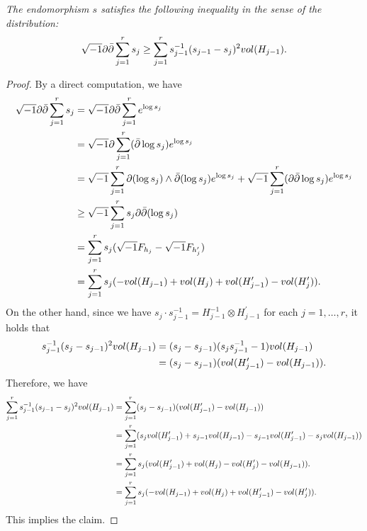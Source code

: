 \documentclass[10pt,a4paper]{amsart}
\def\inum{{\sqrt{-1}}}
\def\vol{{\rm vol}}
\begin{document}
\begin{lemm}\label{ddbars}{\it The endomorphism $s$ satisfies the following inequality in the sense of the distribution:
\begin{align}
\inum\partial\bar{\partial} \sum_{j=1}^rs_j\geq \sum_{j=1}^rs_{j-1}^{-1}(s_{j-1}-s_j)^2\vol(H_{j-1}). \label{s}
\end{align}
}
\end{lemm}

\begin{proof} By a direct computation, we have
\begin{align*}
\inum\partial \bar{\partial} \sum_{j=1}^rs_j&= \inum\partial \bar{\partial}\sum_{j=1}^re^{\log s_j} \\
&= \inum \partial \sum_{j=1}^r(\bar{\partial}\log s_j) e^{\log s_j} \\
&= \inum \sum_{j=1}^r\partial (\log s_j)\wedge\bar{\partial}(\log s_j) e^{\log s_j}+\inum\sum_{j=1}^r(\partial \bar{\partial} \log s_j )e^{\log s_j} \\
&\geq \inum \sum_{j=1}^rs_j\partial \bar{\partial}(\log s_j) \\
&=\sum_{j=1}^rs_j(\inum F_{h_j}-\inum F_{h_j^\prime}) \\
&=\sum_{j=1}^rs_j(-\vol(H_{j-1})+\vol(H_j)+\vol(H_{j-1}^\prime)-\vol(H_j^\prime)). 
\end{align*}
On the other hand, since we have $s_j\cdot s_{j-1}^{-1}=H_{j-1}^{-1}\otimes H_{j-1}^\prime$ for each $j=1,\dots, r$, it holds that
\begin{align*}
s_{j-1}^{-1}(s_j-s_{j-1})^2\vol(H_{j-1})&=(s_j-s_{j-1})(s_js_{j-1}^{-1}-1)\vol(H_{j-1}) \\
&=(s_j-s_{j-1})(\vol(H_{j-1}^\prime)-\vol(H_{j-1})).
\end{align*}
Therefore, we have
\begin{align*}
\sum_{j=1}^rs_{j-1}^{-1}(s_{j-1}-s_j)^2\vol(H_{j-1}) 
&=\sum_{j=1}^r(s_j-s_{j-1})(\vol(H_{j-1}^\prime)-\vol(H_{j-1})) \\
&=\sum_{j=1}^r(s_j\vol(H_{j-1}^\prime)+s_{j-1}\vol(H_{j-1})-s_{j-1}\vol(H_{j-1}^\prime)-s_j\vol (H_{j-1})) \\
&=\sum_{j=1}^rs_j(\vol(H_{j-1}^\prime)+\vol(H_j)-\vol(H_j^\prime)-\vol(H_{j-1})). \\
&=\sum_{j=1}^rs_j(-\vol(H_{j-1})+\vol(H_j)+\vol(H_{j-1}^\prime)-\vol(H_j^\prime)). 
\end{align*}
This implies the claim.
\end{proof}
\end{document}
